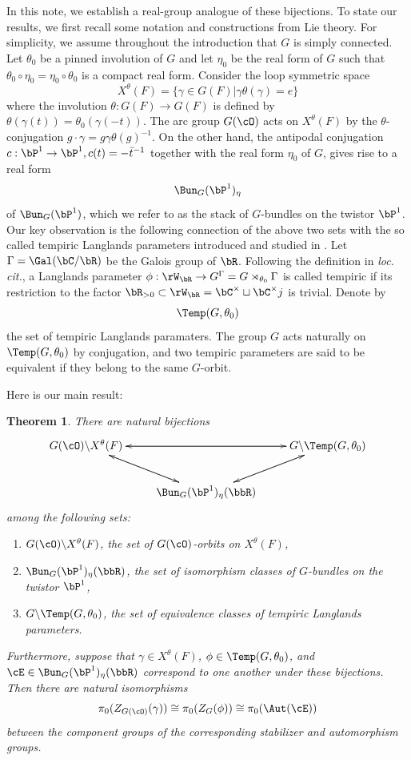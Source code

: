 \documentclass[12pt]{amsart}
\newtheorem{thm}{Theorem}
\theoremstyle{remark}
\begin{document}
In this note, we establish a real-group analogue of these bijections. To state our results, we first recall some notation and constructions from Lie theory. For simplicity, we assume throughout 
the introduction
that $G$ is simply connected.
Let $\theta_0$ be a pinned involution 
of $G$ and 
let 
$\eta_0$ be the real form of $G$
such that $\theta_0\circ\eta_0=\eta_0\circ\theta_0$ is a compact real form. 
Consider the loop symmetric space
\[X^\theta(F)=\{\gamma\in G(F)|\gamma\theta(\gamma)=e\}\]
where the involution $\theta:G(F)\to G(F)$ is defined by $\theta(\gamma(t))=\theta_0(\gamma(-t))$.
The arc group $G(\cO)$ acts on $X^\theta(F)$ by the $\theta$-conjugation $g\cdot\gamma=g\gamma\theta(g)^{-1}$.
On the other hand,  the 
antipodal 
conjugation
$c:\bP^1\to\bP^1, c(t)=-\bar t^{-1}$ together with the real form 
$\eta_0$ of $G$, gives rise to a real form 
\[\Bun_G(\bP^1)_\eta\] of $\Bun_G(\bP^1)$, which we refer to as  the stack of $G$-bundles on the twistor $\bP^1$. Our key
observation is the 
following connection of the above two sets with the so called 
tempiric Langlands parameters introduced and studied in \cite{AA,ABV}.
Let $\Gamma=\Gal(\bC/\bR)$ be the Galois group of $\bR$.
Following the definition in \emph{loc. cit.}, a Langlands parameter 
$\phi:\rW_\bR\to G^\Gamma=G\rtimes_{\theta_0}\Gamma$   is called tempiric if its restriction 
to  the factor $\bR_{>0}\subset\rW_\bR=\bC^\times\sqcup\bC^\times j$
is trivial. Denote by 
\[\Temp(G,\theta_0)\]
the set of tempiric Langlands paramaters. The group
$G$ acts naturally on $\Temp(G,\theta_0)$ by conjugation, and
two tempiric parameters are said to be equivalent  if they belong to the same $G$-orbit.

Here is our  main result:

\begin{thm}\label{main 1:intro}
There are natural bijections 
\[
    \xymatrix{G(\cO)\backslash X^\theta(F)\ar[rr]\ar[dr]&&G\backslash\Temp(G,\theta_0)\ar[dl]\ar[ll]\\
&\Bun_G(\bP^1)_{\eta}(\bbR)\ar[ul]\ar[ur]&}
\]
among the following sets:
\begin{enumerate}
    \item $G(\cO)\backslash X^\theta(F)$,   the set of
$G(\cO)$-orbits on $X^\theta(F)$,
 \item $\Bun_G(\bP^1)_{\eta}(\bbR)$,  the set
 of isomorphism classes of 
 $G$-bundles on the twistor $\bP^1$,
\item $G\backslash\Temp(G,\theta_0)$, the set of equivalence classes of tempiric Langlands parameters.
\end{enumerate}
Furthermore, suppose that
$\gamma\in X^\theta(F)$, $\phi\in\Temp(G,\theta_0)$, and $\cE\in\Bun_G(\bP^1)_{\eta}(\bbR)$
correspond to one another under these bijections. Then there are natural isomorphisms
\[\pi_0(Z_{G(\cO)}(\gamma))\cong\pi_0(Z_G(\phi))\cong\pi_0(\Aut(\cE))\]
between the component groups of the corresponding stabilizer and automorphism groups.
\end{thm}
\end{document}
